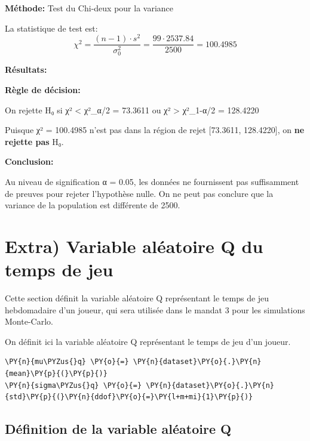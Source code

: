 \textbf{Méthode:} Test du Chi-deux pour la variance

La statistique de test est: \[
\chi^2 = \frac{(n-1) \cdot s^2}{\sigma_0^2} = \frac{99 \cdot 2537.84}{2500} = 100.4985
\]

\textbf{Résultats:}

\textbf{Règle de décision:}

On rejette H₀ si χ² \textless{} χ²\_α/2 = 73.3611 ou χ² \textgreater{}
χ²\_1-α/2 = 128.4220

Puisque χ² = 100.4985 n'est pas dans la région de rejet {[}73.3611,
128.4220{]}, on \textbf{ne rejette pas} H₀.

\textbf{Conclusion:}

Au niveau de signification α = 0.05, les données ne fournissent pas
suffisamment de preuves pour rejeter l'hypothèse nulle. On ne peut pas
conclure que la variance de la population est différente de 2500.



    \section{Extra) Variable aléatoire Q du temps de
jeu}\label{extra-variable-aluxe9atoire-q-du-temps-de-jeu}

Cette section définit la variable aléatoire Q représentant le temps de
jeu hebdomadaire d'un joueur, qui sera utilisée dans le mandat 3 pour
les simulations Monte-Carlo.

On définit ici la variable aléatoire Q représentant le temps de jeu d'un
joueur.

    \begin{tcolorbox}[breakable, size=fbox, boxrule=1pt, pad at break*=1mm,colback=cellbackground, colframe=cellborder]
\begin{Verbatim}[commandchars=\\\{\}]
\PY{n}{mu\PYZus{}q} \PY{o}{=} \PY{n}{dataset}\PY{o}{.}\PY{n}{mean}\PY{p}{(}\PY{p}{)}
\PY{n}{sigma\PYZus{}q} \PY{o}{=} \PY{n}{dataset}\PY{o}{.}\PY{n}{std}\PY{p}{(}\PY{n}{ddof}\PY{o}{=}\PY{l+m+mi}{1}\PY{p}{)}
\end{Verbatim}
\end{tcolorbox}


    \subsection{Définition de la variable aléatoire
Q}\label{duxe9finition-de-la-variable-aluxe9atoire-q}


